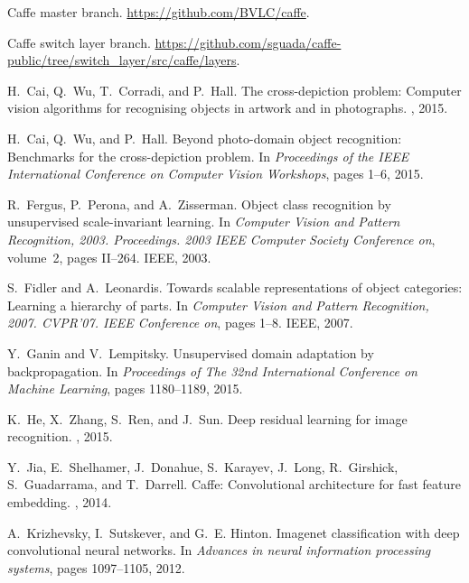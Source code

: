 \documentclass[preprint]{sig-alternate-05-2015}
\begin{document}
\begin{thebibliography}{10}

Caffe master branch.
\newblock \url{https://github.com/BVLC/caffe}.

Caffe switch layer branch.
\newblock
  \url{https://github.com/sguada/caffe-public/tree/switch_layer/src/caffe/layers}.

H.~Cai, Q.~Wu, T.~Corradi, and P.~Hall.
\newblock The cross-depiction problem: Computer vision algorithms for
  recognising objects in artwork and in photographs.
, 2015.

H.~Cai, Q.~Wu, and P.~Hall.
\newblock Beyond photo-domain object recognition: Benchmarks for the
  cross-depiction problem.
\newblock In {\em Proceedings of the IEEE International Conference on Computer
  Vision Workshops}, pages 1--6, 2015.

R.~Fergus, P.~Perona, and A.~Zisserman.
\newblock Object class recognition by unsupervised scale-invariant learning.
\newblock In {\em Computer Vision and Pattern Recognition, 2003. Proceedings.
  2003 IEEE Computer Society Conference on}, volume~2, pages II--264. IEEE,
  2003.

S.~Fidler and A.~Leonardis.
\newblock Towards scalable representations of object categories: Learning a
  hierarchy of parts.
\newblock In {\em Computer Vision and Pattern Recognition, 2007. CVPR'07. IEEE
  Conference on}, pages 1--8. IEEE, 2007.

Y.~Ganin and V.~Lempitsky.
\newblock Unsupervised domain adaptation by backpropagation.
\newblock In {\em Proceedings of The 32nd International Conference on Machine
  Learning}, pages 1180--1189, 2015.

K.~He, X.~Zhang, S.~Ren, and J.~Sun.
\newblock Deep residual learning for image recognition.
, 2015.

Y.~Jia, E.~Shelhamer, J.~Donahue, S.~Karayev, J.~Long, R.~Girshick,
  S.~Guadarrama, and T.~Darrell.
\newblock Caffe: Convolutional architecture for fast feature embedding.
, 2014.

A.~Krizhevsky, I.~Sutskever, and G.~E. Hinton.
\newblock Imagenet classification with deep convolutional neural networks.
\newblock In {\em Advances in neural information processing systems}, pages
  1097--1105, 2012.
\vfill\eject


\end{thebibliography}
\end{document}
